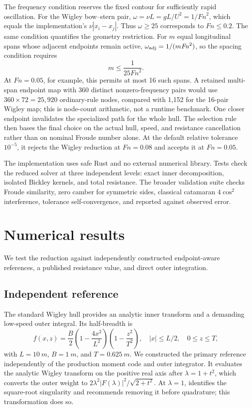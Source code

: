 \documentclass[10pt]{article}
\newcommand{\Fn}{\mathit{Fn}}
\begin{document}
The frequency condition reserves the fixed contour for sufficiently rapid
oscillation.  For the Wigley bow--stern pair,
\(\omega=\nu L=gL/U^2=1/\Fn^2\), which equals the implementation's
\(\nu|x_i-x_j|\).  Thus \(\omega\geq25\) corresponds to \(\Fn\leq0.2\).  The
same condition quantifies the geometry restriction.  For \(m\) equal
longitudinal spans whose adjacent endpoints remain active,
\(\omega_{\rm adj}=1/(m\Fn^2)\), so the spacing condition requires
\begin{equation}
 m\leq\frac{1}{25\Fn^2}.
 \label{eq:spangate}
\end{equation}
At \(\Fn=0.05\), for example, this permits at most 16 such spans.  A retained
multi-span endpoint map with 360 distinct nonzero-frequency pairs would use
\(360\times72=25{,}920\) ordinary-rule nodes, compared with 1,152 for the
16-pair Wigley map; this is node-count arithmetic, not a runtime benchmark.
One closer endpoint invalidates the specialized path for the whole hull.  The
selection rule then bases the final choice on the actual hull, speed, and
resistance cancellation rather than on nominal Froude number alone.  At the
default relative tolerance \(10^{-5}\), it rejects the Wigley reduction at
\(\Fn=0.08\) and accepts it at \(\Fn=0.05\).

The implementation uses safe Rust and no external numerical library.  Tests
check the reduced solver at three independent levels: exact inner
decomposition, isolated Bickley kernels, and total resistance.  The broader
validation suite checks Froude similarity, zero camber for symmetric sides,
classical catamaran \(4\cos^2\) interference, tolerance self-convergence, and
reported against observed error.

\section{Numerical results}
\label{sec:results}

We test the reduction against independently constructed endpoint-aware
references, a published resistance value, and direct outer integration.

\subsection{Independent reference}

The standard Wigley hull provides an analytic inner transform and a demanding
low-speed outer integral.  Its half-breadth is
\begin{equation}
 f(x,z)=\frac{B}{2}\left(1-\frac{4x^2}{L^2}\right)
 \left(1-\frac{z^2}{T^2}\right),
 \quad |x|\leq L/2,\quad 0\leq z\leq T,
 \label{eq:wigley}
\end{equation}
with \(L=\SI{10}{m}\), \(B=\SI{1}{m}\), and
\(T=\SI{0.625}{m}\).  We constructed the primary reference independently of
the production moment code and outer integrator.  It evaluates the analytic
Wigley transform on the positive real axis after \(\lambda=1+t^2\), which
converts the outer weight to
\(2\lambda^2|F(\lambda)|^2/\sqrt{2+t^2}\).  At \(\lambda=1\),
\citet[p.~371]{Tuck1989} identifies the square-root singularity and recommends
removing it before quadrature; this transformation does so.
\end{document}
